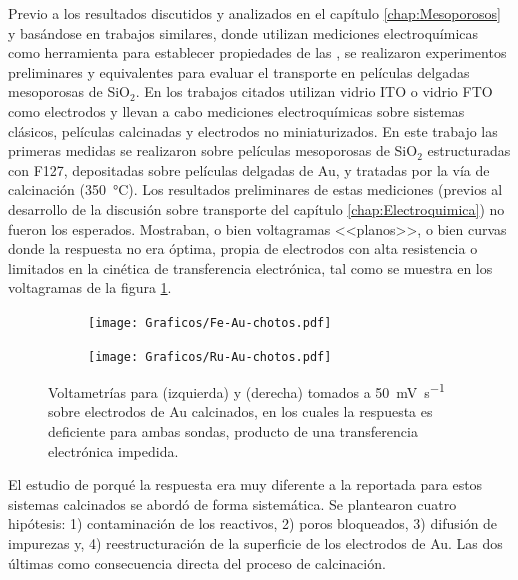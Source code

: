   			Previo a los resultados discutidos y analizados en el capítulo \ref{chap:Mesoporosos} y basándose en trabajos similares\cite{Otal2006,Calvo2009,Fattakhova-Rohlfing2007,Rohlfing2005}, donde utilizan mediciones electroquímicas como herramienta para establecer propiedades de las \pdm, se realizaron experimentos preliminares y equivalentes para evaluar el transporte en películas delgadas mesoporosas de SiO$_2$. En los trabajos citados utilizan vidrio ITO o vidrio FTO como electrodos y llevan a cabo mediciones electroquímicas sobre sistemas clásicos, películas calcinadas y electrodos no miniaturizados. En este trabajo las primeras medidas se realizaron sobre películas mesoporosas de SiO$_2$ estructuradas con F127, depositadas sobre películas delgadas de Au, y tratadas por la vía de calcinación (\SI{350}{\celsius}). Los resultados preliminares de estas mediciones (previos al desarrollo de la discusión sobre transporte del capítulo \ref{chap:Electroquimica}) no fueron los esperados. Mostraban, o bien voltagramas <<planos>>, o bien curvas donde la respuesta no era óptima, propia de electrodos con alta resistencia o limitados en la cinética de transferencia electrónica, tal como se muestra en los voltagramas de la figura \ref{fig:volta_chotos}.

  				\begin{figure}[ht]
		 	      \begin{subfigure}[t]{0.495\textwidth}
		          	\texttt{[image: Graficos/Fe-Au-chotos.pdf]}
		      		\end{subfigure}
		      	 \begin{subfigure}[t]{0.495\textwidth}
		          	\texttt{[image: Graficos/Ru-Au-chotos.pdf]}
		 			\end{subfigure}
		      	 \caption{Voltametrías para \ferroferri\space (izquierda) y \aminorutenio\space (derecha) tomados a \SI{50}{\milli\volt\per\second} sobre electrodos de Au calcinados, en los cuales la respuesta es deficiente para ambas sondas, producto de una transferencia electrónica impedida.}
		      	 \label{fig:volta_chotos}
	      		 \end{figure}	

  			 \vspace*{2mm}El estudio de porqué la respuesta era muy diferente a la reportada para estos sistemas calcinados se abordó de forma sistemática. Se plantearon cuatro hipótesis: 1) contaminación de los reactivos, 2) poros bloqueados, 3) difusión de impurezas y, 4) reestructuración de la superficie de los electrodos de Au. Las dos últimas como consecuencia directa del proceso de calcinación.

